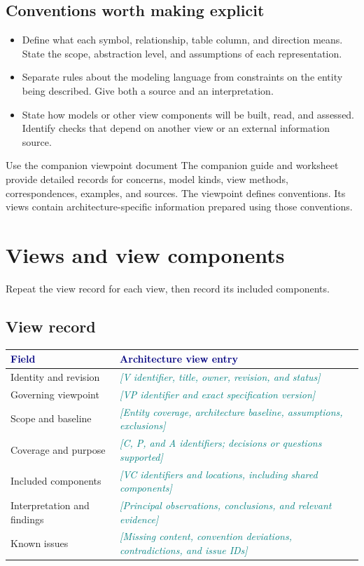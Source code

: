 \documentclass[11pt,letterpaper]{article}
\newcommand{\TemplatePageBreak}{\clearpage}
\newcommand{\FillIn}[1]{\textcolor{Teal}{\sffamily\itshape[#1]}}
\newcommand{\TableHead}[1]{\textcolor{Navy}{\sffamily\bfseries#1}}
\newcommand{\Lead}[1]{\textcolor{Muted}{#1}\par\vspace{3pt}}
\begin{document}
\subsection{Conventions worth making explicit}
\begin{itemize}
\item Define what each symbol, relationship, table column, and direction means.
State the scope, abstraction level, and assumptions of each representation.
\item Separate rules about the modeling language from constraints on the entity
being described. Give both a source and an interpretation.
\item State how models or other view components will be built, read, and assessed.
Identify checks that depend on another view or an external information source.
\end{itemize}

\begin{TemplateNote}{Use the companion viewpoint document}
\small
The companion guide and worksheet provide detailed records for concerns,
model kinds, view methods, correspondences, examples, and sources. The viewpoint
defines conventions. Its views contain architecture-specific information
prepared using those conventions.
\end{TemplateNote}

\TemplatePageBreak
\section{Views and view components}
\Lead{Repeat the view record for each view, then record its included components.}

\subsection{View record}
{\small
\begin{tabularx}{\linewidth}{@{}L{1.41in}Y@{}}
\toprule
\TableHead{Field} & \TableHead{Architecture view entry}\\
\midrule
Identity and revision & \FillIn{V identifier, title, owner, revision, and status}\\
Governing viewpoint & \FillIn{VP identifier and exact specification version}\\
Scope and baseline & \FillIn{Entity coverage, architecture baseline, assumptions, exclusions}\\
Coverage and purpose & \FillIn{C, P, and A identifiers; decisions or questions supported}\\
Included components & \FillIn{VC identifiers and locations, including shared components}\\
Interpretation and findings & \FillIn{Principal observations, conclusions, and relevant evidence}\\
Known issues & \FillIn{Missing content, convention deviations, contradictions, and issue IDs}\\
\bottomrule
\end{tabularx}}
\end{document}
